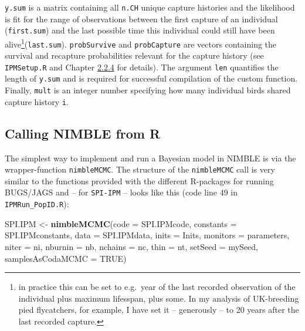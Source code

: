 \documentclass[
]{book}
\newenvironment{Shaded}{\begin{snugshade}}{\end{snugshade}}
\newcommand{\DataTypeTok}[1]{\textcolor[rgb]{0.13,0.29,0.53}{#1}}
\newcommand{\KeywordTok}[1]{\textcolor[rgb]{0.13,0.29,0.53}{\textbf{#1}}}
\newcommand{\NormalTok}[1]{#1}
\newcommand{\OtherTok}[1]{\textcolor[rgb]{0.56,0.35,0.01}{#1}}
\newcommand{\StringTok}[1]{\textcolor[rgb]{0.31,0.60,0.02}{#1}}
\begin{document}
\texttt{y.sum} is a matrix containing all \texttt{n.CH} unique capture histories and the
likelihood is fit for the range of observations between the first capture of an
individual (\texttt{first.sum}) and the last possible time this individual could still
have been alive\footnote{in practice this can be set to e.g.~year of the last recorded
  observation of the individual plus maximum lifesspan, plus some. In my analysis
  of UK-breeding pied flycatchers, for example, I have set it -- generously -- to
  20 years after the last recorded capture.}(\texttt{last.sum}). \texttt{probSurvive} and
\texttt{probCapture} are vectors containing the survival and recapture probabilities
relevant for the capture history (see \texttt{IPMSetup.R} and Chapter \protect\hyperlink{ux5cux23ux5cux23ux5cux2520Mark-recaptureux5cux2520dataux5cux2520likelihood}{2.2.4} for details). The argument \texttt{len} quantifies the length of \texttt{y.sum}
and is required for successful compilation of the custom function. Finally, \texttt{mult}
is an integer number specifying how many individual birds shared capture history
\texttt{i}.

\hypertarget{calling-nimble-from-r}{%
\subsection{Calling NIMBLE from R}\label{calling-nimble-from-r}}

The simplest way to implement and run a Bayesian model in NIMBLE is via the
wrapper-function \texttt{nimbleMCMC}. The structure of the \texttt{nimbleMCMC} call is very
similar to the functions provided with the different R-packages for running
BUGS/JAGS and -- for \texttt{SPI-IPM} -- looks like this (code line 49 in \texttt{IPMRun\_PopID.R}):

\begin{Shaded}
\begin{Highlighting}[]
\NormalTok{SPI.IPM <-}\StringTok{ }\KeywordTok{nimbleMCMC}\NormalTok{(}\DataTypeTok{code =}\NormalTok{ SPI.IPMcode, }\DataTypeTok{constants =}\NormalTok{ SPI.IPMconstants, }\DataTypeTok{data =}\NormalTok{ SPI.IPMdata, }\DataTypeTok{inits =}\NormalTok{ Inits, }\DataTypeTok{monitors =}\NormalTok{ parameters, }\DataTypeTok{niter =}\NormalTok{ ni, }\DataTypeTok{nburnin =}\NormalTok{ nb, }\DataTypeTok{nchains =}\NormalTok{ nc, }\DataTypeTok{thin =}\NormalTok{ nt, }\DataTypeTok{setSeed =}\NormalTok{ mySeed, }\DataTypeTok{samplesAsCodaMCMC =} \OtherTok{TRUE}\NormalTok{)}
\end{Highlighting}
\end{Shaded}
\end{document}
